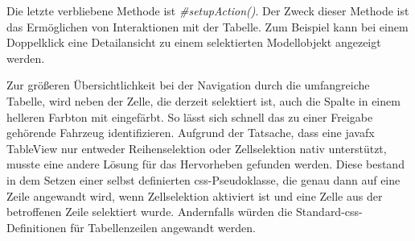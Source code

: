 Die letzte verbliebene Methode ist \textit{\#setupAction()}. Der Zweck dieser Methode ist das Ermöglichen von Interaktionen mit der Tabelle. Zum Beispiel kann bei einem Doppelklick eine Detailansicht zu einem selektierten Modellobjekt angezeigt werden.

Zur größeren Übersichtlichkeit bei der Navigation durch die umfangreiche Tabelle, wird neben der Zelle, die derzeit selektiert ist, auch die Spalte in einem helleren Farbton mit eingefärbt. So lässt sich schnell das zu einer Freigabe gehörende Fahrzeug identifizieren. Aufgrund der Tatsache, dass eine \gls{javafx} TableView nur entweder Reihenselektion oder Zellselektion nativ unterstützt, musste eine andere Lösung für das Hervorheben gefunden werden. Diese bestand in dem Setzen einer selbst definierten \gls{css}-Pseudoklasse, die genau dann auf eine Zeile angewandt wird, wenn Zellselektion aktiviert ist und eine Zelle aus der betroffenen Zeile selektiert wurde. Andernfalls würden die Standard-\gls{css}-Definitionen für Tabellenzeilen angewandt werden.